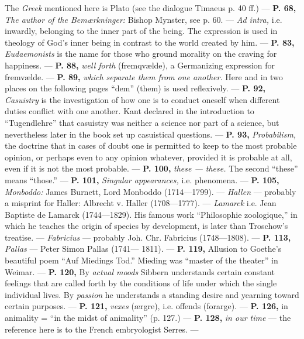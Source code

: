 \documentclass[12pt,a4paper,openany]{book}
\newcommand{\opage}[1]{\marginnote{\footnotesize\textit{[#1]}}}
\begin{document}
The \textit{Greek} mentioned here is Plato (see the dialogue Timaeus p. 40 ff.) --- \textbf{P. 68,}
\textit{The author of the Bemærkninger:} Bishop Mynster, see p. 60. --- \textit{Ad intra,} i.e.
inwardly, belonging to the inner part of the being. The expression is used in theology of
\setcounter{footnote}{0}%
\opage{303}God's inner being in contrast to the world created by him. --- \textbf{P. 83,}
\textit{Eudaemonists} is the name for those who ground morality on the craving for happiness. ---
\textbf{P. 88,} \textit{well forth} (fremqvælde), a Germanizing expression for fremvælde. --- \textbf{P. 89,} \textit{which separate
them from one another.} Here and in two places on the following pages ``dem'' (them) is used
reflexively. --- \textbf{P. 92,} \textit{Casuistry} is the investigation of how one is to conduct oneself
when different duties conflict with one another. Kant declared in the introduction
to ``Tugendlehre'' that casuistry was neither a science nor part
of a science, but nevertheless later in the book set up casuistical questions.
--- \textbf{P. 93,} \textit{Probabilism,} the doctrine that in cases of doubt one is permitted
to keep to the most probable opinion, or perhaps even to any
opinion whatever, provided it is probable at all, even if it
is not the most probable. --- \textbf{P. 100,} \textit{these --- these.} The second ``these''
means ``those.'' --- \textbf{P. 101,} \textit{Singular appearances,} i.e. phenomena. --- \textbf{P. 105,} \textit{Monboddo:}
James Burnett, Lord Monboddo (1714—1799). --- \textit{Hallen} --- probably
a misprint for Haller: Albrecht v. Haller (1708—1777). --- \textit{Lamarck} i.e.
Jean Baptiste de Lamarck (1744---1829). His famous work ``Philosophie
zoologique,'' in which he teaches the origin of species by development, is
later than Troschow's treatise. --- \textit{Fabricius} --- probably Joh. Chr. %
Fabricius (1748—1808). --- \textbf{P. 113,} \textit{Pallas} --- Peter Simon Pallas (1741---
1811). --- \textbf{P. 119,} Allusion to Goethe's beautiful poem ``Auf Miedings
Tod.'' Mieding was ``master of the theater'' in Weimar. --- \textbf{P. 120,} By \textit{actual
moods} Sibbern understands certain constant feelings that are called forth
by the conditions of life under which the single individual lives. By \textit{passion} he understands
a standing desire and yearning toward certain purposes. --- \textbf{P. 121,} \textit{vexes} (ærgre),
i.e. offends (forarge). --- \textbf{P. 126,} in animality = ``in the midst of animality'' (p. 127.) ---
\textbf{P. 128,} \textit{in our time} --- the reference here is to the French embryologist Serres. ---
\end{document}
